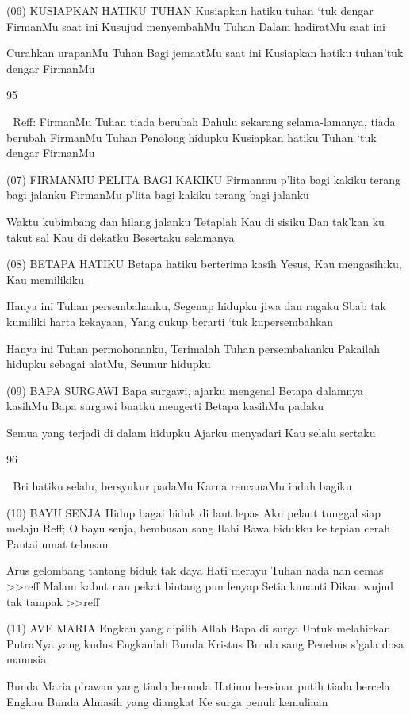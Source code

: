 \documentclass[10pt,a5paper,fancyhdr]{memoir}
\begin{document}
(06) KUSIAPKAN HATIKU TUHAN 
Kusiapkan hatiku tuhan ‘tuk dengar FirmanMu saat ini 
Kusujud menyembahMu Tuhan Dalam hadiratMu saat ini 

Curahkan urapanMu Tuhan Bagi jemaatMu saat ini 
Kusiapkan hatiku tuhan’tuk dengar FirmanMu 

95 



Reff: 
FirmanMu Tuhan tiada berubah 
Dahulu sekarang selama-lamanya, tiada berubah 
FirmanMu Tuhan Penolong hidupku 
Kusiapkan hatiku Tuhan ‘tuk dengar FirmanMu 

(07) FIRMANMU PELITA BAGI KAKIKU 
Firmanmu p’lita bagi kakiku terang bagi jalanku 
FirmanMu p’lita bagi kakiku terang bagi jalanku 

Waktu kubimbang dan hilang jalanku 
Tetaplah Kau di sisiku 
Dan tak’kan ku takut sal Kau di dekatku 
Besertaku selamanya 

(08) BETAPA HATIKU 
Betapa hatiku berterima kasih Yesus, Kau mengasihiku, Kau 
memilikiku 

Hanya ini Tuhan persembahanku, Segenap hidupku jiwa dan ragaku 
Sbab tak kumiliki harta kekayaan, Yang cukup berarti ‘tuk 
kupersembahkan 

Hanya ini Tuhan permohonanku, Terimalah Tuhan persembahanku 
Pakailah hidupku sebagai alatMu, Seumur hidupku 

(09) BAPA SURGAWI 
Bapa surgawi, ajarku mengenal 
Betapa dalamnya kasihMu 
Bapa surgawi buatku mengerti 
Betapa kasihMu padaku 

Semua yang terjadi di dalam hidupku 
Ajarku menyadari Kau selalu sertaku 

96 



Bri hatiku selalu, bersyukur padaMu 
Karna rencanaMu indah bagiku 

(10) BAYU SENJA 
Hidup bagai biduk di laut lepas 
Aku pelaut tunggal siap melaju 
Reff; 
O bayu senja, hembusan sang Ilahi 
Bawa bidukku ke tepian cerah 
Pantai umat tebusan 

Arus gelombang tantang biduk tak daya 
Hati merayu Tuhan nada nan cemas 
>>reff 
Malam kabut nan pekat bintang pun lenyap 
Setia kunanti Dikau wujud tak tampak >>reff 

(11) AVE MARIA 
Engkau yang dipilih Allah Bapa di surga 
Untuk melahirkan PutraNya yang kudus 
Engkaulah Bunda Kristus 
Bunda sang Penebus s’gala dosa manusia 

Bunda Maria p’rawan yang tiada bernoda 
Hatimu bersinar putih tiada bercela 
Engkau Bunda Almasih yang diangkat 
Ke surga penuh kemuliaan 
\end{document}
